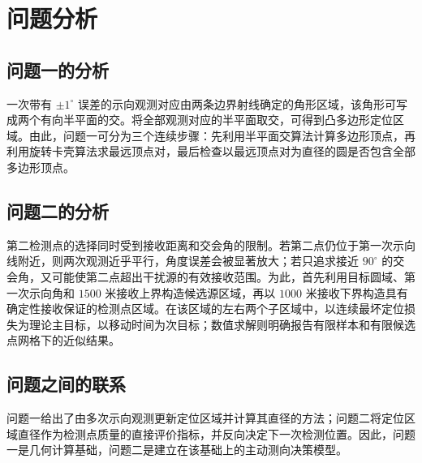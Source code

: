 \section{问题分析}

\subsection{问题一的分析}

一次带有 $\pm1^\circ$ 误差的示向观测对应由两条边界射线确定的角形区域，该角形可写成两个有向半平面的交。将全部观测对应的半平面取交，可得到凸多边形定位区域。由此，问题一可分为三个连续步骤：先利用半平面交算法计算多边形顶点，再利用旋转卡壳算法求最远顶点对，最后检查以最远顶点对为直径的圆是否包含全部多边形顶点。

\subsection{问题二的分析}

第二检测点的选择同时受到接收距离和交会角的限制。若第二点仍位于第一次示向线附近，则两次观测近乎平行，角度误差会被显著放大；若只追求接近 $90^\circ$ 的交会角，又可能使第二点超出干扰源的有效接收范围。为此，首先利用目标圆域、第一次示向角和 $1500$ 米接收上界构造候选源区域，再以 $1000$ 米接收下界构造具有确定性接收保证的检测点区域。在该区域的左右两个子区域中，以连续最坏定位损失为理论主目标，以移动时间为次目标；数值求解则明确报告有限样本和有限候选点网格下的近似结果。

\subsection{问题之间的联系}

问题一给出了由多次示向观测更新定位区域并计算其直径的方法；问题二将定位区域直径作为检测点质量的直接评价指标，并反向决定下一次检测位置。因此，问题一是几何计算基础，问题二是建立在该基础上的主动测向决策模型。
